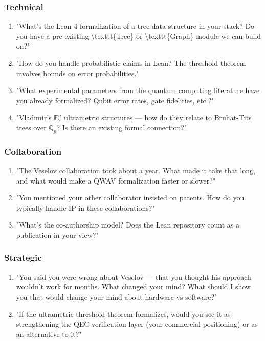 \documentclass[11pt,a4paper]{article}
\begin{document}
\subsubsection{Technical}

\begin{enumerate}
\item "What's the Lean 4 formalization of a tree data structure in your stack? Do you have a pre-existing \textbackslash{}texttt\{Tree\} or \textbackslash{}texttt\{Graph\} module we can build on?"
\item "How do you handle probabilistic claims in Lean? The threshold theorem involves bounds on error probabilities."
\item "What experimental parameters from the quantum computing literature have you already formalized? Qubit error rates, gate fidelities, etc.?"
\item "Vladimir's $\mathbb{F}_2^n$ ultrametric structures  --- how do they relate to Bruhat-Tits trees over $\mathbb{Q}_p$? Is there an existing formal connection?"
\end{enumerate}


\subsubsection{Collaboration}

\begin{enumerate}
\item "The Veselov collaboration took about a year. What made it take that long, and what would make a QWAV formalization faster or slower?"
\item "You mentioned your other collaborator insisted on patents. How do you typically handle IP in these collaborations?"
\item "What's the co-authorship model? Does the Lean repository count as a publication in your view?"
\end{enumerate}


\subsubsection{Strategic}

\begin{enumerate}
\item "You said you were wrong about Veselov  --- that you thought his approach wouldn't work for months. What changed your mind? What should I show you that would change your mind about hardware-vs-software?"
\item "If the ultrametric threshold theorem formalizes, would you see it as strengthening the QEC verification layer (your commercial positioning) or as an alternative to it?"
\end{enumerate}
\end{document}

